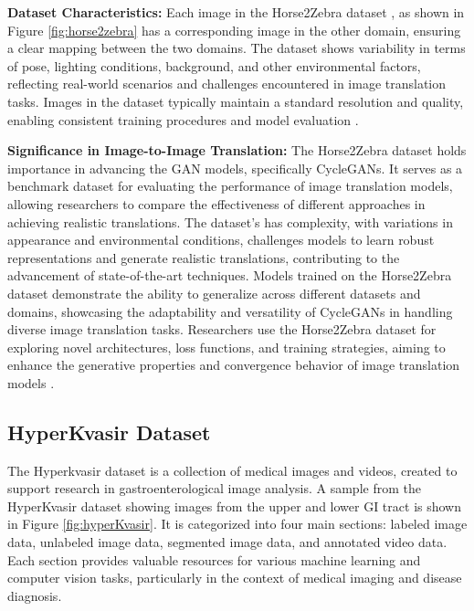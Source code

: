 \documentclass[UKenglish,12pt]{master-style}
\begin{document}
\textbf{Dataset Characteristics:} Each image in the Horse2Zebra dataset , as shown in Figure \ref{fig:horse2zebra} has a corresponding image in the other domain, ensuring a clear mapping between the two domains. The dataset shows variability in terms of pose, lighting conditions, background, and other environmental factors, reflecting real-world scenarios and challenges encountered in image translation tasks. Images in the dataset typically maintain a standard resolution and quality, enabling consistent training procedures and model evaluation \cite{unpaired_horse2zebra_cyclgan}.

\textbf{Significance in Image-to-Image Translation: }The Horse2Zebra dataset holds importance in advancing the GAN models, specifically CycleGANs. It serves as a benchmark dataset for evaluating the performance of image translation models, allowing researchers to compare the effectiveness of different approaches in achieving realistic translations. The dataset's has complexity, with variations in appearance and environmental conditions, challenges models to learn robust representations and generate realistic translations, contributing to the advancement of state-of-the-art techniques. Models trained on the Horse2Zebra dataset demonstrate the ability to generalize across different datasets and domains, showcasing the adaptability and versatility of CycleGANs in handling diverse image translation tasks. Researchers use the Horse2Zebra dataset for exploring novel architectures, loss functions, and training strategies, aiming to enhance the generative properties and convergence behavior of image translation models \cite{unpaired_horse2zebra_cyclgan}.

\subsection{HyperKvasir Dataset}

The Hyperkvasir dataset \cite{HyperKvasir_Dataset} is a collection of medical images and videos,  created to support research in gastroenterological image analysis. A sample from the HyperKvasir dataset showing images from the upper and lower GI tract is shown in Figure \ref{fig:hyperKvasir}. It is categorized into four main sections: labeled image data, unlabeled image data, segmented image data, and annotated video data. Each section provides valuable resources for various machine learning and computer vision tasks, particularly in the context of medical imaging and disease diagnosis.
\end{document}

